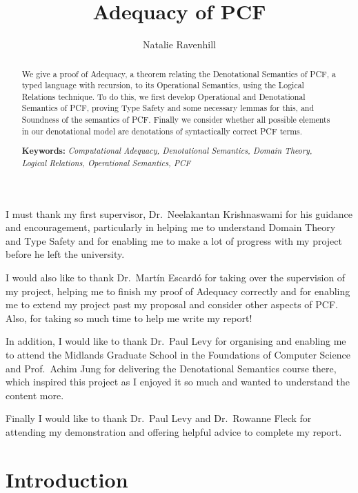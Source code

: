 \documentclass{bhamthesis}
\title{Adequacy of PCF}
\author{Natalie Ravenhill}
\begin{document}
\maketitle
\newcommand{\natb}{\mathbb{N}_{\bot}}
\begin{abstract}
We give a proof of Adequacy, a theorem relating the Denotational Semantics of PCF, a typed language with recursion,  to its Operational Semantics, using the Logical Relations technique. To do this, we first develop Operational and Denotational Semantics of PCF, proving Type Safety and some necessary lemmas for this, and Soundness of the semantics of PCF. Finally we consider whether all possible elements in our denotational model are denotations of syntactically correct PCF terms.
\vspace{0.5cm}

\textbf{Keywords:} \emph{Computational Adequacy, Denotational Semantics, Domain Theory,  Logical Relations, Operational Semantics, PCF}
\end{abstract}

\begin{acknowledgements}
I must thank my first supervisor, Dr.\ Neelakantan Krishnaswami for his guidance and encouragement, particularly in helping me to understand Domain Theory and Type Safety and for enabling me to make a lot of progress with my project before he left the university.

I would also like to thank Dr.\ Mart\'{i}n Escard\'{o} for taking over the supervision of my project, helping me to finish my proof of Adequacy correctly and for enabling me to extend my project past my proposal and consider other aspects of PCF. Also, for taking so much time to help me write my report!

In addition, I would like to thank Dr.\ Paul Levy for organising and enabling me to attend the Midlands Graduate School in the Foundations of Computer Science and Prof.\ Achim Jung for delivering the Denotational Semantics course there, which inspired this project as I enjoyed it so much and wanted to understand the content more. 

Finally I would like to thank Dr.\ Paul Levy and Dr.\ Rowanne Fleck for attending my demonstration and offering helpful advice to complete my report.
\end{acknowledgements}

\tableofcontents
\chapter{Introduction}\label{ch1}

\end{document}
